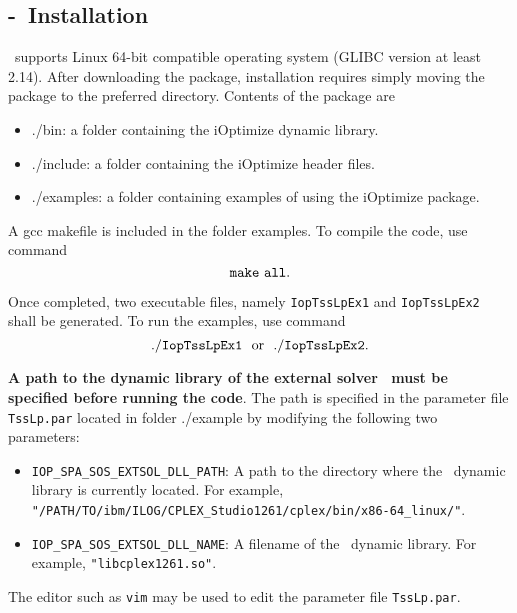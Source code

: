 \subsection{\IOP-\SOS \ Installation}
\label{subsec:Installation}
\IOP~supports Linux 64-bit compatible operating system (GLIBC version at least 2.14). After downloading the package, installation requires simply moving the package to the preferred directory. Contents of the package are
\begin{itemize}
  \item ./bin: a folder containing the iOptimize dynamic library.
  \item ./include: a folder containing the iOptimize header files.
  \item ./examples: a folder containing examples of using the iOptimize package.
\end{itemize}

A gcc makefile is included in the folder examples. To compile the code, use command
\[
    {\tt make~all}.
\]

Once completed, two executable files, namely {\tt IopTssLpEx1} and {\tt IopTssLpEx2} shall be generated. To run the examples, use command
\[
    {\tt ./IopTssLpEx1} \mbox{~~or~~} {\tt ./IopTssLpEx2}.
\]

{\bf A path to the dynamic library of the external solver \Cplex~must be specified before running the code}. The path is specified in the parameter file {\tt TssLp.par} located in folder ./example by modifying the following two parameters:
\begin{itemize}
  \item {\tt IOP\_SPA\_SOS\_EXTSOL\_DLL\_PATH}: A path to the directory where the \Cplex~dynamic library is currently located. For example, {\tt"/PATH/TO/ibm/ILOG/}{\tt CPLEX\_Studio1261/}{\tt cplex/bin/x86-64\_linux/"}.
  \item {\tt IOP\_SPA\_SOS\_EXTSOL\_DLL\_NAME}: A filename of the \Cplex~dynamic library. For example, {\tt "libcplex1261.so"}.
\end{itemize}
The editor such as {\tt vim} may be used to edit the parameter file {\tt TssLp.par}.

